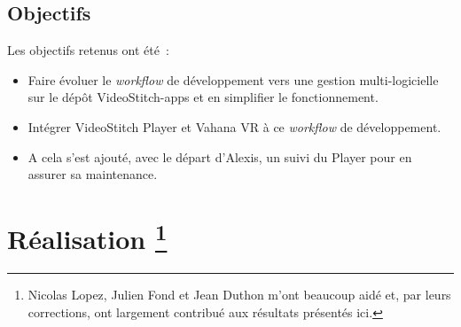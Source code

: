\subsection{Objectifs}
Les objectifs retenus ont été~:
\begin{itemize}
  \item Faire évoluer le \textit{workflow} de développement vers une gestion multi-logicielle sur le dépôt VideoStitch-apps 
  et en simplifier le fonctionnement.
  \item Intégrer VideoStitch Player et Vahana VR à ce \textit{workflow} de développement.
  \item A cela s'est ajouté, avec le départ d'Alexis, un suivi du Player pour en assurer
  sa maintenance.
\end{itemize}


\section[Réalisation]{Réalisation
\protect\footnote{Nicolas Lopez, Julien Fond et Jean Duthon m'ont beaucoup aidé et, par 
leurs corrections, ont largement contribué aux résultats présentés ici.}}

